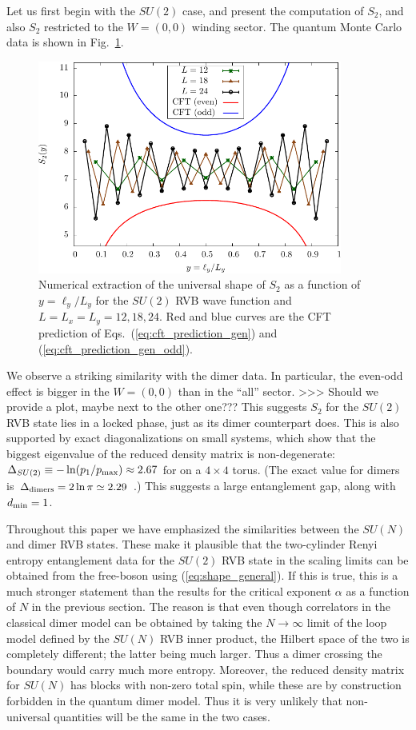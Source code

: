 \documentclass[11pt]{iopart}
\begin{document}
Let us first begin with the $SU(2)$ case, and present the computation of $S_2$, and also $S_2$ restricted to the $W=(0,0)$ winding sector. The quantum Monte Carlo data is shown in Fig.~\ref{fig:SU2_shape}.\begin{figure}[ht]
 \begin{center}
  \includegraphics[width=10cm]{./figures/SU2_shape.pdf}
 \end{center}
\caption{Numerical extraction of the universal shape of $S_2$ as a function of $y=\ell_y/L_y$ for the $SU(2)$ RVB wave function and $L=L_x=L_y=12,18,24$. Red and blue curves are the CFT prediction of Eqs.~(\ref{eq:cft_prediction_gen}) and (\ref{eq:cft_prediction_gen_odd}). }
\label{fig:SU2_shape}
\end{figure}
We observe a striking similarity with the dimer data. In particular, the even-odd effect is bigger in the $W=(0,0)$ than in the ``all'' sector. >>> Should we provide a plot, maybe next to the other one???
This suggests $S_2$ for the $SU(2)$ RVB state lies in a locked phase, just as its dimer counterpart does. 
This is also supported by exact diagonalizations on small systems, which show that the biggest eigenvalue of the reduced density matrix is non-degenerate:  $\Delta_{SU(2)}\equiv -\ln (p_1/p_{\rm max}) \approx 2.67$ for on a $4\times 4$ torus. (The exact value for dimers is  $\Delta_{\rm dimers}=2\ln \pi\simeq 2.29$ \cite{Stephan2012}.) This suggests a large entanglement gap, along with $d_{\rm min}=1$.

Throughout this paper we have emphasized the similarities between the $SU(N)$ and dimer RVB states. These make it plausible that the two-cylinder Renyi entropy entanglement data for the $SU(2)$ RVB state in the scaling limits can be obtained from the free-boson using (\ref{eq:shape_general}). If this is true, this is a much stronger statement than the results for the critical exponent $\alpha$ as a function of $N$ in the previous section. The reason is that even though correlators in the classical dimer model can be obtained by taking the $N\to\infty$ limit of the loop model defined by the $SU(N)$ RVB inner product, the Hilbert space of the two is completely different; the latter being much larger. Thus a dimer crossing the boundary would carry much more entropy. Moreover, the reduced density matrix for $SU(N)$ has blocks with non-zero total spin, while these are by construction forbidden in the quantum dimer model. Thus it is very unlikely that non-universal quantities will be the same in the two cases. 
\end{document}
